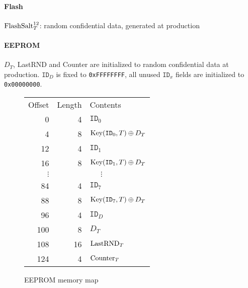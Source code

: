 \documentclass[a4paper,10pt]{scrartcl}
\begin{document}
\paragraph{Flash} $\textnormal{FlashSalt}_T^{12}$: random confidential data, generated at production
\paragraph{EEPROM} $D_T$, LastRND and Counter are initialized to random confidential data at production. $\texttt{ID}_D$ is fixed to \verb|0xFFFFFFFF|, all unused $\texttt{ID}_x$ fields are initialized to \verb|0x00000000|.

\begin{figure}[h]
  \centering \caption{EEPROM memory map}
  \begin{tabular}{r|r|l|}
    \multicolumn{1}{r}{Offset} & \multicolumn{1}{r}{Length} & \multicolumn{1}{l}{Contents} \\\cline{2-3}
    0 & 4 & $\texttt{ID}_0$ \\\cline{2-3}
    4 & 8 & $\textnormal{Key}(\texttt{ID}_0,T) \oplus D_T$ \\\cline{2-3}
   12 & 4 & $\texttt{ID}_1$ \\\cline{2-3}
   16 & 8 & $\textnormal{Key}(\texttt{ID}_1,T) \oplus D_T$ \\\cline{2-3}
   $\vdots$ &\multicolumn{2}{|c|}{$\vdots$} \\\cline{2-3}
   84 & 4 & $\texttt{ID}_7$ \\\cline{2-3}
   88 & 8 & $\textnormal{Key}(\texttt{ID}_7,T) \oplus D_T$ \\\cline{2-3}
   96 & 4 & $\texttt{ID}_D$ \\\cline{2-3}
  100 & 8 & $D_T$ \\\cline{2-3}
  108 & 16 & $\textnormal{LastRND}_T$ \\\cline{2-3}
  124 & 4 & $\textnormal{Counter}_T$ \\\cline{2-3}
  \end{tabular}
\end{figure}
\end{document}

